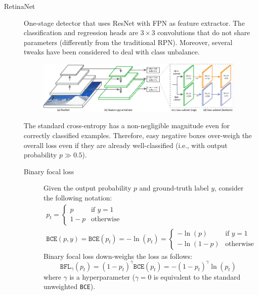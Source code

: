 \begin{description}
    \item[RetinaNet] 
        One-stage detector that uses ResNet with FPN as feature extractor. The classification and regression heads are $3 \times 3$ convolutions that do not share parameters (differently from the traditional RPN). Moreover, several tweaks have been considered to deal with class unbalance.

        \begin{figure}[H]
            \centering
            \includegraphics[width=0.8\linewidth]{./img/_retinanet.pdf}
        \end{figure}

        \begin{remark}
            The standard cross-entropy has a non-negligible magnitude even for correctly classified examples. Therefore, easy negative boxes over-weigh the overall loss even if they are already well-classified (i.e., with output probability $p \gg 0.5$).
        \end{remark}

        \begin{description}
            \item[Binary focal loss] 
                Given the output probability $p$ and ground-truth label $y$, consider the following notation:
                \[
                    \begin{gathered}
                        p_t = \begin{cases}
                            p & \text{if $y=1$} \\
                            1-p & \text{otherwise}
                        \end{cases} 
                        \\
                        \texttt{BCE}(p, y) = \texttt{BCE}(p_t) = -\ln(p_t) = \begin{cases}
                            -\ln(p) & \text{if $y=1$} \\
                            -\ln(1-p) & \text{otherwise}
                        \end{cases}
                    \end{gathered}
                \]
                Binary focal loss down-weighs the loss as follows:
                \[ \texttt{BFL}_\gamma(p_t) = (1-p_t)^\gamma\texttt{BCE}(p_t) = -(1-p_t)^\gamma \ln(p_t) \]
                where $\gamma$ is a hyperparameter ($\gamma=0$ is equivalent to the standard unweighted \texttt{BCE}).


\end{description}
\end{description}

